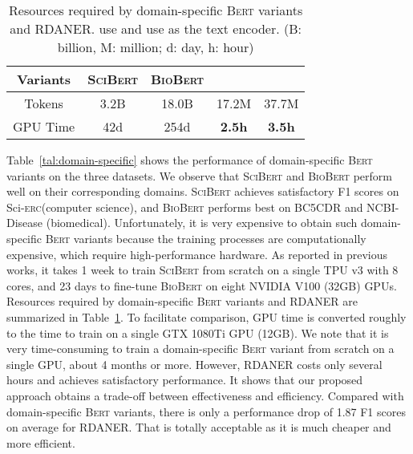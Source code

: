 \documentclass[10pt, conference, compsocconf]{IEEEtran}
\newcommand{\bert}{\textsc{Bert}\xspace}
\newcommand{\scibert}{\textsc{SciBert}\xspace}
\newcommand{\biobert}{\textsc{BioBert}\xspace}
\newcommand{\Scierc}{\textsc{S}ci-\textsc{erc}\xspace}
\newcommand{\rdaner}{\textsc{RDANER}\xspace}
\newcommand{\bertcs}{\xspace}
\newcommand{\bertbio}{\xspace}
\newcommand{\rdanercs}{\xspace}
\newcommand{\rdanerbio}{\xspace}
\begin{document}
    \begin{table}[t!]
        \caption{Resources required by domain-specific \bert variants and \rdaner. 
        \rdanercs use \bertcs and \rdanerbio use \bertbio as the text encoder.
        (B: billion, M: million; d: day, h: hour)}
        \label{tal:pre-trained-models}
        \centering
        \setlength{\tabcolsep}{5.5pt}
\begin{tabular}{c|cc|cc}
            \toprule
    
            Variants & \scibert & \biobert  & \rdanercs & \rdanerbio  \\
            \hline
Tokens & 3.2B & 18.0B & 17.2M & 37.7M \\
            GPU Time  & 42d & 254d & \textbf{2.5h}  & \textbf{3.5h}\\


            \bottomrule
        \end{tabular}
\end{table}
    


Table~\ref{tal:domain-specific} 
shows the performance of domain-specific \bert variants on the three datasets.
We observe that \scibert and \biobert perform well on their corresponding domains. \scibert achieves
satisfactory F1 scores on \Scierc (computer science), and 
\biobert performs best on BC5CDR and NCBI-Disease (biomedical). 
Unfortunately, it is very expensive to obtain such domain-specific \bert variants 
because the training processes are computationally expensive, which require high-performance hardware. 
As reported in previous works\cite{beltagy-etal-2019-scibert,lee2020biobert},
it takes 1 week to train \scibert from scratch on a single TPU v3 with 8 cores, 
and 23 days to fine-tune \biobert on eight NVIDIA V100 (32GB) GPUs.
Resources required by domain-specific \bert variants and \rdaner are summarized
in Table~\ref{tal:pre-trained-models}. 
To facilitate comparison, GPU time is converted roughly to the time to train on a single GTX 1080Ti GPU (12GB).
We note that it is very time-consuming to train a domain-specific \bert variant from scratch on a single GPU, 
about 4 months or more. However, \rdaner costs only several hours and achieves satisfactory performance.   
It shows that our proposed approach obtains a trade-off between effectiveness and efficiency.
Compared with domain-specific \bert variants, there is only
a performance drop of 1.87 F1 scores on average for \rdaner. 
That is totally acceptable as it is much cheaper and more efficient.
\end{document}
